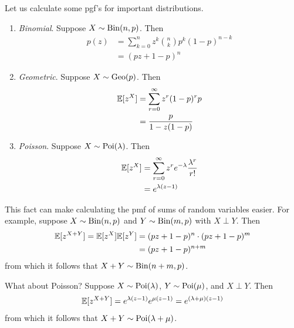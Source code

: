 \documentclass{../template/note}
\begin{document}
    \begin{example*}
        Let us calculate some pgf's for important distributions.
        \begin{enumerate}[label=\protect\circled{\arabic*}]
            \item \emph{Binomial}. Suppose \(X \sim \operatorname{Bin}(n, p)\). Then
            \begin{align*}
                p(z) &= \sum_{k=0}^n z^k \binom n k p^k (1-p)^{n-k} \\
                &= (pz + 1-p)^n
            \end{align*}
            \item \emph{Geometric}. Suppose \(X \sim \operatorname{Geo}(p)\). Then
            \begin{align*}
                \mathbb E[z^X] &= \sum_{r=0}^\infty z^r (1-p)^r p \\
                &= \frac p {1-z(1-p)}
            \end{align*}
            \item \emph{Poisson}. Suppose \(X \sim \operatorname{Poi}(\lambda)\). Then
            \begin{align*}
                \mathbb E[z^X] &= \sum_{r=0}^\infty z^r e^{-\lambda} \frac{\lambda^r}{r!} \\
                &= e^{\lambda(z-1)}
            \end{align*}
        \end{enumerate}
    \end{example*}
    
    \begin{example*}
        This fact can make calculating the pmf of sums of random variables easier. For example, suppose \(X \sim \operatorname{Bin}(n, p)\) and \(Y \sim \operatorname{Bin}(m, p)\) with \(X \perp Y\). Then
        \begin{align*}
            \mathbb E[z^{X+Y}] = \mathbb E[z^X] \mathbb E[z^Y] &= (pz+1-p)^n \cdot (pz+1-p)^m \\
            &= (pz+1-p)^{n+m}
        \end{align*}
        from which it follows that \(X + Y \sim \operatorname{Bin}(n + m, p)\).

        What about Poisson? Suppose \(X \sim \operatorname{Poi}(\lambda)\), \(Y \sim \operatorname{Poi}(\mu)\), and \(X \perp Y\). Then
        \begin{align*}
            \mathbb E[z^{X+Y}] = e^{\lambda(z-1)}e^{\mu(z-1)} = e^{(\lambda+\mu)(z-1)}
        \end{align*}
        from which it follows that \(X + Y \sim \operatorname{Poi}(\lambda + \mu)\).
    \end{example*}
\end{document}
